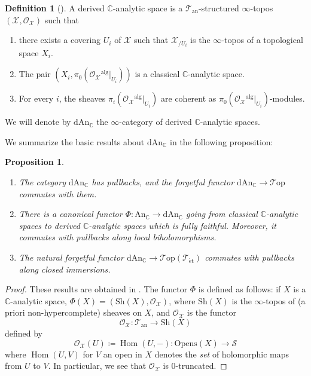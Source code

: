 \documentclass[12pt,a4paper,reqno]{amsart}
\theoremstyle{plain}
\newtheorem{prop}[thm]{Proposition}
\theoremstyle{definition}
\newtheorem{defin}[thm]{Definition}
\theoremstyle{remark}
\numberwithin{equation}{section}
\begin{document}
\begin{defin}[{\cite[Def.\ 12.3]{DAG-IX}}] \label{def:derived_canal_space}
	A derived {$\mathbb C$-analytic\xspace} space is a ${{\mathcal T}_{\mathrm{an}}}$-structured $\infty$-topos $({\mathcal X}, {\mathcal O}_{\mathcal X})$ such that
	\begin{enumerate}
		\item there exists a covering $U_i$ of ${\mathcal X}$ such that ${\mathcal X}_{/U_i}$ is the $\infty$-topos of a topological space $X_i$.
		\item The pair $(X_i, \pi_0( {\mathcal O}_{\mathcal X}{^\mathrm{alg}}|_{U_i}))$ is a classical {$\mathbb C$-analytic\xspace} space.
		\item For every $i$, the sheaves $\pi_i( {\mathcal O}_{\mathcal X}{^\mathrm{alg}} |_{U_i})$ are coherent as $\pi_0({\mathcal O}_{\mathcal X}{^\mathrm{alg}} |_{U_i})$-modules.
	\end{enumerate}
	We will denote by ${\mathrm{dAn}_{\mathbb C}}$ the $\infty$-category of derived {$\mathbb C$-analytic\xspace} spaces.
\end{defin}

We summarize the basic results about ${\mathrm{dAn}_{\mathbb C}}$ in the following proposition:

\begin{prop} \label{prop:basic_properties_of_DAn}
	\begin{enumerate}
		\item The category ${\mathrm{dAn}_{\mathbb C}}$ has pullbacks, and the forgetful functor ${\mathrm{dAn}_{\mathbb C}} \to {\mathcal T\mathrm{op}}$ commutes with them.
		\item There is a canonical functor $\Phi \colon {\mathrm{An}_{{\mathbb C}}} \to {\mathrm{dAn}_{\mathbb C}}$ going from classical {$\mathbb C$-analytic\xspace} spaces to derived {$\mathbb C$-analytic\xspace} spaces which is fully faithful. Moreover, it commutes with pullbacks along local biholomorphisms.
		\item The natural forgetful functor ${\mathrm{dAn}_{\mathbb C}} \to {\mathcal T\mathrm{op}}({{\mathcal T}_{\mathrm{\acute{e}t}}})$ commutes with pullbacks along closed immersions.
	\end{enumerate}
\end{prop}

\begin{proof}
	These results are obtained in \cite[Â§12]{DAG-IX}. The functor $\Phi$ is defined as follows: if $X$ is a {$\mathbb C$-analytic\xspace} space, $\Phi(X) = ({\mathrm{Sh}}(X), {\mathcal O}_{\mathcal X})$, where ${\mathrm{Sh}}(X)$ is the $\infty$-topos of (a priori non-hypercomplete) sheaves on $X$, and ${\mathcal O}_{\mathcal X}$ is the functor
	\[ {\mathcal O}_{\mathcal X} \colon {{\mathcal T}_{\mathrm{an}}} \to {\mathrm{Sh}}(X) \]
	defined by
	\[ {\mathcal O}_{\mathcal X}(U) \coloneqq \operatorname{Hom}(U,-) \colon \mathrm{Opens}(X) \to {\mathcal S} \]
	where $\operatorname{Hom}(U,V)$ for $V$ an open in $X$ denotes the \emph{set} of holomorphic maps from $U$ to $V$. In particular, we see that ${\mathcal O}_{\mathcal X}$ is $0$-truncated.
\end{proof}
\end{document}
